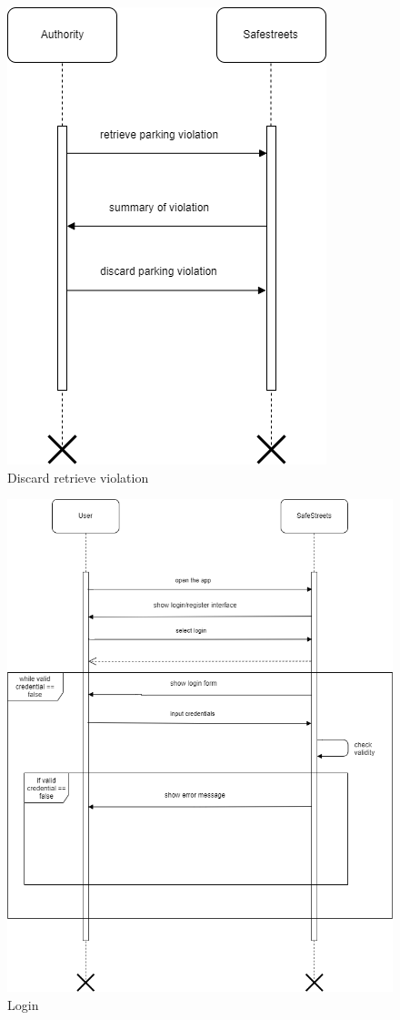 \documentclass{article}
\begin{document}
\begin{figure}[h!]
    \centering
    \includegraphics[scale=0.5]{img/sequence_diagrams/discard_retrieve_violation.png}
    \caption{Discard retrieve violation}
\end{figure}

\begin{figure}[h!]
    \centering
    \includegraphics[scale=0.5]{img/sequence_diagrams/login.png}
    \caption{Login}
\end{figure}
\end{document}
